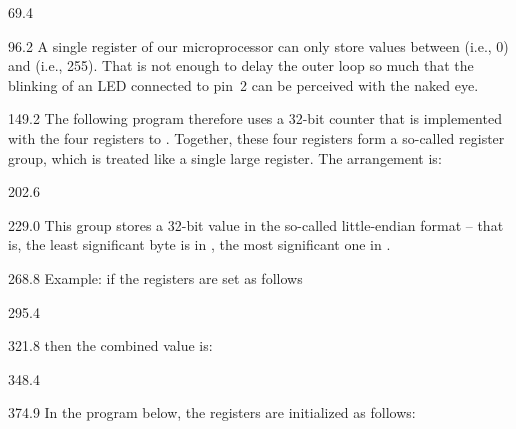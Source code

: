 \documentclass{aslab}
\begin{document}
\nextpage
\begin{region}{69.4}
\end{region}

\begin{region}[pitch=13.2]{96.2}
A single register of our microprocessor can only store values between
 (i.e., 0) and  (i.e., 255). That is not enough to
delay the outer loop so much that the blinking of an LED connected to
pin~2 can be perceived with the naked eye.
\end{region}

\begin{region}[pitch=13.4]{149.2}
The following program therefore uses a 32-bit counter that is implemented
with the four registers  to . Together, these four
registers form a so-called register group, which is treated like a single
large register. The arrangement is:
\end{region}

\begin{region}[x=59.8,right=0]{202.6}
\end{region}

\begin{region}[pitch=13.4]{229.0}
This group stores a 32-bit value in the so-called little-endian format --
that is, the least significant byte is in , the most significant
one in .
\end{region}

\begin{region}{268.8}
Example: if the registers are set as follows
\end{region}

\begin{region}{295.4}
\end{region}

\begin{region}{321.8}
then the combined value is:
\end{region}

\begin{region}{348.4}
\end{region}

\begin{region}{374.9}
In the program below, the registers are initialized as follows:
\end{region}
\end{document}
